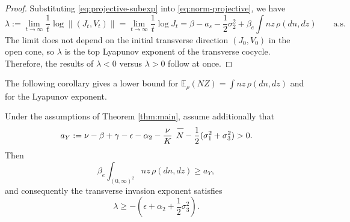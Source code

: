 \documentclass[12pt,a4paper,reqno]{amsart}
\theoremstyle{definition}
\theoremstyle{remark}
\theoremstyle{plain}
\let\svoverline\overline
\newcommand{\uc}[1]{\mkern 5mu\svoverline{\mkern-1mu#1\mkern-0.3mu \rule{0pt}{3.5mm}}\mkern 0mu}
\let\overline\uc
\begin{document}
\begin{proof}
Substituting \eqref{eq:projective-subexp} into \eqref{eq:norm-projective}, we have
$$
\lambda
:=
\lim_{t\to\infty}\frac{1}{t}\log\|(J_t,V_t)\|
=
\lim_{t\to\infty}\frac{1}{t}\log J_t
=
\beta-a_s-\frac12\sigma_2^2
+\beta_e\int nz\,\rho(dn,dz)
\qquad\text{a.s.}
$$
The limit does not depend on the initial transverse direction $(J_0,V_0)$ in the open cone, so $\lambda$ is the top Lyapunov exponent of the transverse cocycle. Therefore, the results of $\lambda<0$ versus $\lambda>0$ follow at once.
\end{proof}

The following corollary gives a lower bound for $\mathbb E_\rho(NZ)=\int nz\,\rho(dn,dz)$ and for the Lyapunov exponent.

\begin{corollary}
\label{cor:lambda-lower-bound}
Under the assumptions of Theorem \ref{thm:main}, assume additionally that
\begin{equation}\label{eq:aY-positive}
a_Y
:=
\nu-\beta+\gamma-\epsilon-\alpha_2
-\frac{\nu}{K}\overline N
-\frac12(\sigma_1^2+\sigma_3^2)
>0.
\end{equation}
Then
\begin{equation}\label{eq:nz-lower-bound}
\beta_e\int_{(0,\infty)^2} nz\,\rho(dn,dz)
\geq a_Y,
\end{equation}
and consequently the transverse invasion exponent satisfies
\begin{equation}\label{eq:lambda-lower-bound}
\lambda
\geq
-\left(
\epsilon+\alpha_2+\frac12\sigma_3^2
\right).
\end{equation}
\end{corollary}
\end{document}
